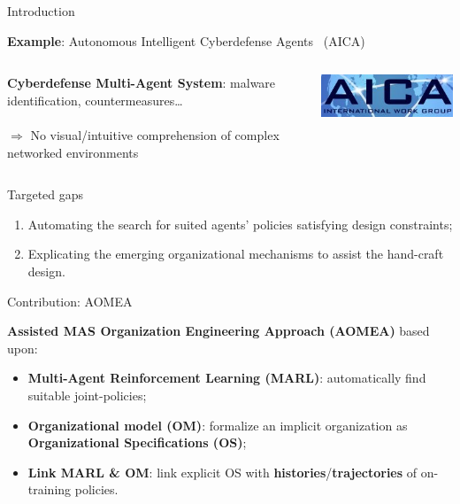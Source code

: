 \begin{frame}[allowframebreaks]{Introduction}
\begin{exampleblock}{\textbf{Example}: Autonomous Intelligent Cyberdefense Agents~\cite{Kott2023} (AICA)}
        \begin{columns}
            \hspace{5ex}
            \begin{column}{0.85\textwidth}
                \textbf{Cyberdefense Multi-Agent System}: malware identification, countermeasures\dots \\ \phantom{x} \\
                $\Longrightarrow$ No visual/intuitive comprehension of complex networked environments
            \end{column}
            \begin{column}{0.22\textwidth}
                \hspace{-2.5ex}
                \includegraphics[width=0.8\linewidth]{figures/AICA_IWG.jpg}
            \end{column}
        \end{columns}

    \end{exampleblock}

    \begin{alertblock}{Targeted gaps}
        \begin{enumerate}
            \item Automating the search for suited agents' policies satisfying design constraints;
            \item Explicating the emerging organizational mechanisms to assist the hand-craft design.
        \end{enumerate}
    \end{alertblock}

    \begin{prosblock}{Contribution: AOMEA}

        \textbf{Assisted MAS Organization Engineering Approach (AOMEA)} based upon:
        \begin{itemize}
            \item \textbf{Multi-Agent Reinforcement Learning (MARL)}: automatically find suitable joint-policies;
            \item \textbf{Organizational model (OM)}: formalize an implicit organization as \textbf{Organizational Specifications (OS)};
            \item \textbf{Link MARL \& OM}: link explicit OS with \textbf{histories}/\textbf{trajectories} of on-training policies.
        \end{itemize}


\end{prosblock}
\end{frame}
